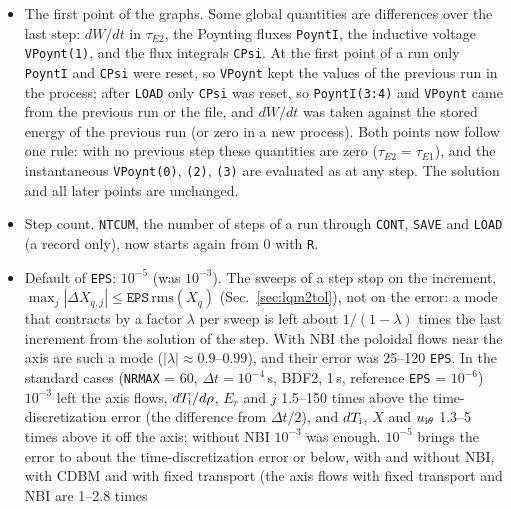 \documentclass[11pt]{article}
\def\r#1{{\rm#1}}
\begin{document}
\begin{itemize}
  after which \texttt{CONT} continues from that step; \texttt{SAVE}, \texttt{LOAD} and \texttt{R}
  work as after a complete run, and the next run ramps the current from its value at that step.  A
  failure at step $k$ leaves the state of a run of $k-1$ steps bit for bit, and \texttt{CONT} or
  \texttt{LOAD} from it continues bit for bit as from that run.
\item The first point of the graphs.  Some global quantities are differences over the last step:
  $dW/dt$ in $\tau_{E2}$, the Poynting fluxes \texttt{PoyntI}, the inductive voltage
  \texttt{VPoynt(1)}, and the flux integrals \texttt{CPsi}.  At the first point of a run only
  \texttt{PoyntI} and \texttt{CPsi} were reset, so \texttt{VPoynt} kept the values of the previous run
  in the process; after \texttt{LOAD} only \texttt{CPsi} was reset, so \texttt{PoyntI(3:4)} and
  \texttt{VPoynt} came from the previous run or the file, and $dW/dt$ was taken against the stored
  energy of the previous run (or zero in a new process).  Both points now follow one rule: with no
  previous step these quantities are zero ($\tau_{E2} = \tau_{E1}$), and the instantaneous
  \texttt{VPoynt(0)}, \texttt{(2)}, \texttt{(3)} are evaluated as at any step.  The solution and all
  later points are unchanged.
\item Step count.  \texttt{NTCUM}, the number of steps of a run through \texttt{CONT},
  \texttt{SAVE} and \texttt{LOAD} (a record only), now starts again from 0 with \texttt{R}.
\item Default of \texttt{EPS}: $10^{-5}$ (was $10^{-3}$).  The sweeps of a step stop on the
  increment, $\max_j|\Delta X_{q,j}| \le \texttt{EPS}\,\mathrm{rms}(X_q)$ (Sec.~\ref{sec:lqm2tol}), not
  on the error: a mode that contracts by a factor $\lambda$ per sweep is left about $1/(1-\lambda)$
  times the last increment from the solution of the step.  With NBI the poloidal flows near the axis
  are such a mode ($|\lambda| \approx 0.9$--$0.99$), and their error was 25--120 \texttt{EPS}.  In the
  standard cases (\texttt{NRMAX} = 60, $\Delta t = 10^{-4}$\,s, BDF2, 1\,s, reference
  \texttt{EPS} = $10^{-6}$) $10^{-3}$ left the axis flows, $dT_\r{i}/d\rho$, $E_r$ and $j$ 1.5--150
  times above the time-discretization error (the difference from $\Delta t/2$), and $dT_\r{i}$, $X$
  and $u_{\r{i}\theta}$ 1.3--5 times above it off the axis; without NBI $10^{-3}$ was enough.
  $10^{-5}$ brings the error to about the time-discretization error or below, with and without NBI,
  with CDBM and with fixed transport (the axis flows with fixed transport and NBI are 1--2.8 times

\end{itemize}
\end{document}
